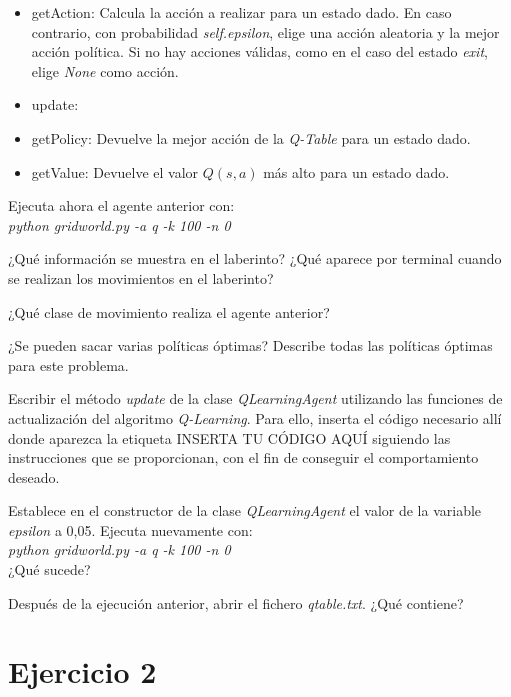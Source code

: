 \documentclass[11pt]{exam}
\begin{document}
\begin{questions}
\begin{itemize}
	\item getAction: Calcula la acción a realizar para un estado dado. En caso contrario, con probabilidad \textit{self.epsilon}, elige una acción aleatoria y la mejor acción política. Si no hay acciones válidas, como en el caso del estado \textit{exit}, elige \textit{None} como acción.
	
	\item update:
	
	\item getPolicy: Devuelve la mejor acción de la \textit{Q-Table} para un estado dado.
	
	\item getValue: Devuelve el valor $Q(s,a)$ más alto para un estado dado.
		
\end{itemize}

{ \question Ejecuta ahora el agente anterior con: \\ \textit{python gridworld.py -a q -k 100 -n 0}}

{ \question ¿Qué información se muestra en el laberinto? ¿Qué aparece por terminal cuando se realizan los movimientos en el laberinto? 
}

{ \question ¿Qué clase de movimiento realiza el agente anterior?}

{ \question ¿Se pueden sacar varias políticas óptimas? Describe todas las políticas óptimas para este problema.}

{ \question Escribir el método \textit{update} de la clase \textit{QLearningAgent} utilizando las funciones de actualización del algoritmo \textit{Q-Learning}. Para ello, inserta el código necesario allí donde aparezca la etiqueta INSERTA TU CÓDIGO AQUÍ siguiendo las instrucciones que se proporcionan, con el fin de conseguir el comportamiento deseado. }

{ \question Establece en el constructor de la clase \textit{QLearningAgent} el valor de la variable \textit{epsilon} a 0,05. Ejecuta nuevamente con: \\ \textit{python gridworld.py -a q -k 100 -n 0} \\ ¿Qué sucede?
}

{ \question Después de la ejecución anterior, abrir el fichero \textit{qtable.txt}. ¿Qué contiene?}

\end{questions}

\section*{Ejercicio 2}
\end{document}
